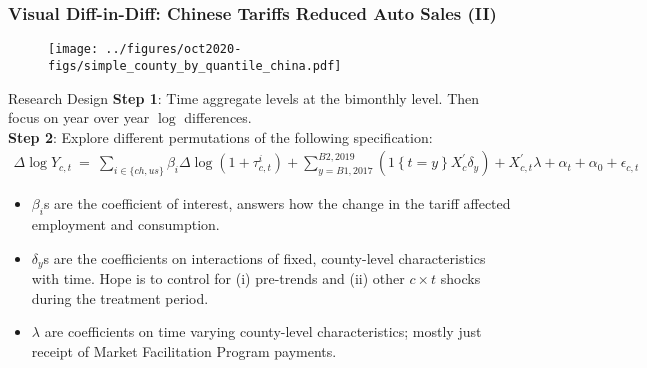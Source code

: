 \documentclass[9pt,pdftex,aspectratio=1610]{beamer}
\theoremstyle{definition}
\begin{document}
\begin{frame}[t]
\frametitle{Visual Diff-in-Diff: Chinese Tariffs Reduced Auto Sales (II)}
\begin{figure}[t]
\centerline{\texttt{[image: ../figures/oct2020-figs/simple\_county\_by\_quantile\_china.pdf]}}
\end{figure}
\end{frame}


\begin{frame}[t]{Research Design}
\textbf{Step 1}: Time aggregate levels at the bimonthly level. Then focus on year over year $\log$ differences.\\
\bigskip
\bigskip
\textbf{Step 2}: Explore different permutations of the following specification:
\begin{eqnarray*}
\Delta \log Y_{c,t} \ = \ \sum_{i\in \{ch, us\}}\beta_{i} \Delta \log(1 + \tau^{i}_{c,t}) + \sum_{y = B1, 2017}^{B2, 2019}\left( \mathrm{1} \left\{t = y \right\}
X^{'}_{c}\delta_y \right) + X^{'}_{c,t}\lambda + \alpha_t + \alpha_0 +  \epsilon_{c,t}
\end{eqnarray*}
\begin{itemize}
\item $\beta_{i}$s are the coefficient of interest, answers how the change in the tariff affected employment and consumption.
\smallskip
\item $\delta_y$s are the coefficients on interactions of fixed, county-level characteristics with time. Hope is to control for (i) pre-trends and (ii) other $c\times t$ shocks during the treatment period.
\smallskip
\item $\lambda$ are coefficients on time varying county-level characteristics; mostly just receipt of Market Facilitation Program payments.
\end{itemize}
\end{frame}

\end{document}
